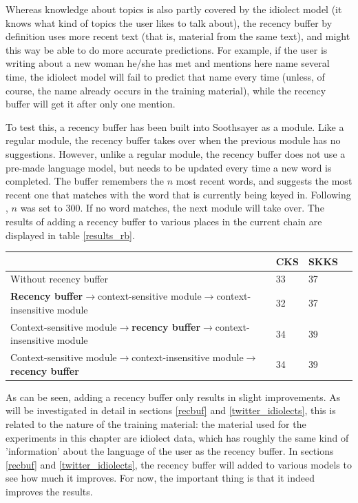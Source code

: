 \documentclass[12pt]{article}
\let\originaltable\table
\let\endoriginaltable\endtable
\renewenvironment{table}[1][ht]{%
  \originaltable[#1]
  \centering}%
  {\endoriginaltable}
\begin{document}
Whereas knowledge about topics is also partly covered by the idiolect model (it knows what kind of topics the user likes to talk about), the recency buffer by definition uses more recent text (that is, material from the same text), and might this way be able to do more accurate predictions. For example, if the user is writing about a new woman he/she has met and mentions here name several time, the idiolect model will fail to predict that name every time (unless, of course, the name already occurs in the training material), while the recency buffer will get it after only one mention.

To test this, a recency buffer has been built into Soothsayer as a module. Like a regular module, the recency buffer takes over when the previous module has no suggestions. However, unlike a regular module, the recency buffer does not use a pre-made language model, but needs to be updated every time a new word is completed. The buffer remembers the $n$ most recent words, and suggests the most recent one that matches with the word that is currently being keyed in. Following , $n$ was set to 300. If no word matches, the next module will take over. The results of adding a recency buffer to various places in the current chain are displayed in table \ref{results_rb}.

\begin{table}[h]
\begin{tabular}{l|lll} 

&CKS&SKKS\\
\hline
Without recency buffer&33&37\\
\textbf{Recency buffer}$\rightarrow$context-sensitive module$\rightarrow$context-insensitive module&32&37\\
Context-sensitive module$\rightarrow$\textbf{recency buffer}$\rightarrow$context-insensitive module&34&39\\
Context-sensitive module$\rightarrow$context-insensitive module$\rightarrow$\textbf{recency buffer}&34&39\\
\end{tabular} 
\caption{Percentage of keystrokes saved with and without a recency buffer.} \label{results_rb}
\end{table}

As can be seen, adding a recency buffer only results in slight improvements. As will be investigated in detail in sections \ref{recbuf} and \ref{twitter_idiolects}, this is related to the nature of the training material: the material used for the experiments in this chapter are idiolect data, which has roughly the same kind of 'information' about the language of the user as the recency buffer. In sections \ref{recbuf} and \ref{twitter_idiolects}, the recency buffer will added to various models to see how much it improves. For now, the important thing is that it indeed improves the results. 
\end{document}
